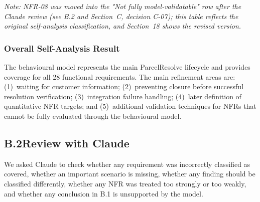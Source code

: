 \documentclass[11pt,a4paper]{article}
\begin{document}
\textit{Note: NFR-08 was moved into the "Not fully model-validatable" row after the Claude review (see B.2 and Section~C, decision C-07); this table reflects the original self-analysis classification, and Section~18 shows the revised version.}

\subsubsection*{Overall Self-Analysis Result}

The behavioural model represents the main ParcelResolve lifecycle and provides coverage for all 28 functional requirements. The main refinement areas are: (1)~waiting for customer information; (2)~preventing closure before successful resolution verification; (3)~integration failure handling; (4)~later definition of quantitative NFR targets; and (5)~additional validation techniques for NFRs that cannot be fully evaluated through the behavioural model.

\vspace{8pt}
\subsection*{B.2\enspace Review with Claude}

We asked Claude to check whether any requirement was incorrectly classified as covered, whether an important scenario is missing, whether any finding should be classified differently, whether any NFR was treated too strongly or too weakly, and whether any conclusion in B.1 is unsupported by the model.
\end{document}
